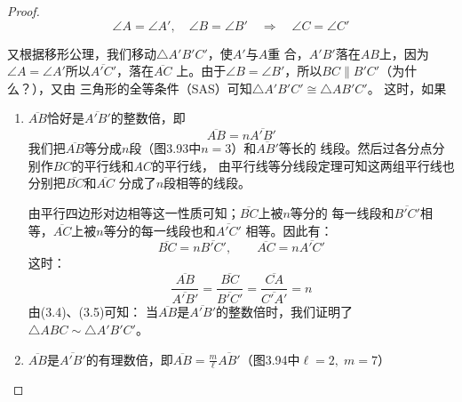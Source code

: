 \begin{proof}
\begin{equation}
    \angle A=\angle A',\quad \angle B=\angle B' \quad \Rightarrow\quad \angle C=\angle C'
\end{equation}
    
又根据移形公理，我们移动$\triangle A'B'C'$，使$A'$与$A$重
合，$A'B'$落在$AB$上，因为$\angle A=\angle A'$所以$\overline{A'C'}$，落在$\overline{AC}$
上。由于$\angle B=\angle B'$，所以$BC\parallel B'C'$（为什么？），又由
三角形的全等条件（SAS）可知$\triangle A'B'C'\cong \triangle AB'C'$。
这时，如果

\begin{enumerate}
    \item $\overline{AB}$恰好是$\overline{A'B'}$的整数倍，即
\[\overline{AB}=n\overline{A'B'}\]
我们把$\overline{AB}$等分成$n$段（图3.93中$n=3$）和$\overline{AB'}$等长的
线段。然后过各分点分别作$BC$的平行线和$AC$的平行线，
由平行线等分线段定理可知这两组平行线也分别把$\overline{BC}$和$\overline{AC}$
分成了$n$段相等的线段。

由平行四边形对边相等这一性质可知；$\overline{BC}$上被$n$等分的
每一线段和$\overline{B'C'}$相等，$\overline{AC}$上被$n$等分的每一线段也和$\overline{A'C'}$
相等。因此有：
\[\overline{BC}=n\overline{B'C'},\qquad \overline{AC}=n\overline{A'C'}\]
这时：
\begin{equation}
    \frac{\overline{AB}}{\overline{A'B'}}=\frac{\overline{BC}}{\overline{B'C'}}=\frac{\overline{CA}}{\overline{C'A'}}=n
\end{equation}
由(3.4)、(3.5)可知：
当$\overline{AB}$是$\overline{A'B'}$的整数倍时，我们证明了
$\triangle ABC\sim \triangle A'B'C'$。
\item $\overline{AB}$是$\overline{A'B'}$的有理数倍，即$\overline{AB}=\frac{m}{\ell}\overline{AB'}$（图3.94中$\ell=2,\; m=7$）

\begin{figure}
    \centering
\begin{tikzpicture}


\end{tikzpicture}
\end{figure}
\end{enumerate}
\end{proof}
